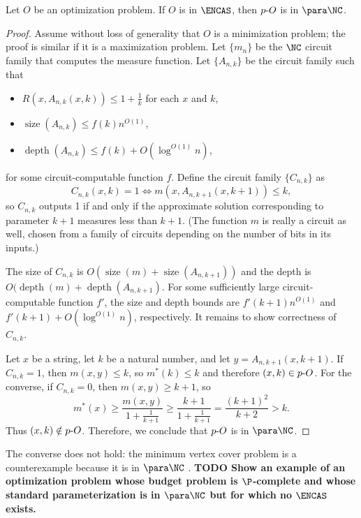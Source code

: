 \documentclass{article}
\newcommand{\todo}[1]{\textbf{TODO #1}}
\newcommand{\dash}{\textnormal{-}}
\DeclareMathOperator{\depth}{depth}
\DeclareMathOperator{\size}{size}
\begin{document}
\begin{theorem}\label{thm:encasfpp}
  Let $O$ be an optimization problem.
  If $O$ is in $\ENCAS$, then $p\dash{O}$ is in $\para \NC$.
\end{theorem}
\begin{proof}
  Assume without loss of generality that $O$ is a minimization problem; the proof is similar if it is a maximization problem.
  Let $\{m_n\}$ be the $\NC$ circuit family that computes the measure function.
  Let $\{A_{n, k}\}$ be the circuit family such that
  \begin{itemize}
  \item $R(x, A_{n, k}(x, k)) \leq 1 + \frac{1}{k}$ for each $x$ and $k$,
  \item $\size(A_{n, k}) \leq f(k) n^{O(1)}$,
  \item $\depth(A_{n, k}) \leq f(k) + O(\log^{O(1)} n)$,
  \end{itemize}
  for some circuit-computable function $f$.
  Define the circuit family $\{C_{n, k}\}$ as
  \[
  C_{n, k}(x, k) = 1 \iff m(x, A_{n, k + 1}(x, k + 1)) \leq k,
  \]
  so $C_{n, k}$ outputs 1 if and only if the approximate solution corresponding to parameter $k + 1$ measures less than $k + 1$.
  (The function $m$ is really a circuit as well, chosen from a family of circuits depending on the number of bits in its inputs.)

  The size of $C_{n, k}$ is $O(\size(m) + \size(A_{n, k + 1}))$ and the depth is $O(\depth(m) + \depth(A_{n, k + 1})$.
  For some sufficiently large circuit-computable function $f'$, the size and depth bounds are $f'(k + 1) n^{O(1)}$ and $f'(k + 1) + O(\log^{O(1)} n)$, respectively.
  It remains to show correctness of $C_{n, k}$.

  Let $x$ be a string, let $k$ be a natural number, and let $y = A_{n, k + 1}(x, k + 1)$.
  If $C_{n, k} = 1$, then $m(x, y) \leq k$, so $m^*(k) \leq k$ and therefore $(x, k) \in p \dash O$.
  For the converse, if $C_{n, k} = 0$, then $m(x, y) \geq k + 1$, so
  \[
  m^*(x) \geq \frac{m(x, y)}{1 + \frac{1}{k + 1}} \geq \frac{k + 1}{1 + \frac{1}{k + 1}} = \frac{(k + 1)^2}{k + 2} > k.
  \]
  Thus $(x, k) \notin p \dash O$.
  Therefore, we conclude that $p \dash O$ is in $\para \NC$.
\end{proof}

The converse does not hold: the minimum vertex cover problem is a counterexample because it is in $\para \NC$ \autocite[Theorem~4.5]{bst15}.
\todo{Show an example of an optimization problem whose budget problem is $\P$-complete and whose standard parameterization is in $\para \NC$ but for which no $\ENCAS$ exists.}
\end{document}
